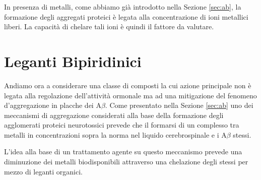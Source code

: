 \documentclass[a4paper, 12pt]{article}
\begin{document}
In presenza di metalli, come abbiamo già introdotto nella Sezione \ref{sec:ab}, la formazione degli aggregati proteici è legata alla concentrazione di ioni metallici liberi. La capacità di chelare tali ioni è quindi il fattore da valutare.

\section{Leganti Bipiridinici}
\label{sec:byp}
Andiamo ora a considerare una classe di composti la cui azione principale non è legata alla regolazione dell'attività ormonale ma ad una mitigazione del fenomeno d'aggregazione in placche dei A$\beta$. Come presentato nella Sezione \ref{sec:ab} uno dei meccanismi di aggregazione considerati alla base della formazione degli agglomerati proteici neurotossici prevede che il formarsi di un complesso tra metalli in concentrazioni sopra la norma nel liquido cerebrospinale e i A$\beta$ stessi.

L'idea alla base di un trattamento agente su questo meccanismo prevede una diminuzione dei metalli biodisponibili attraverso una chelazione degli stessi per mezzo di leganti organici.
\end{document}
